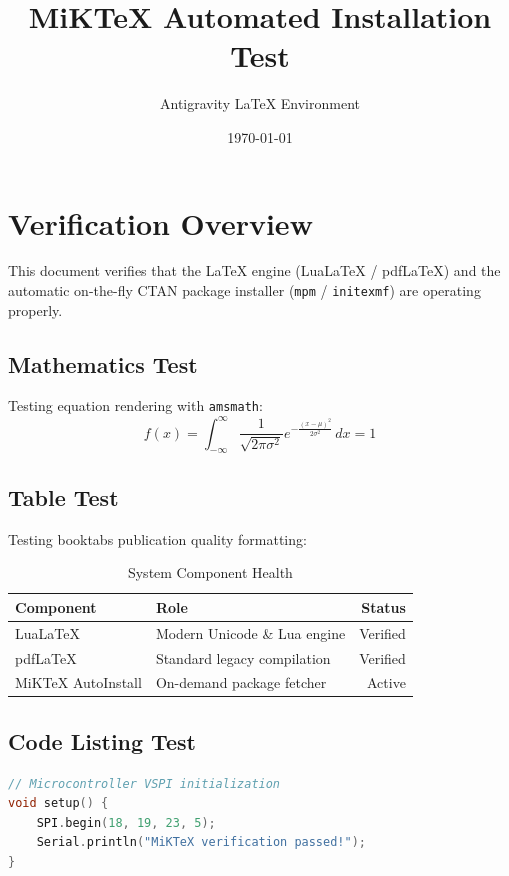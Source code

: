 \documentclass{article}
\title{MiKTeX Automated Installation Test}
\author{Antigravity LaTeX Environment}
\date{\today}
\begin{document}
\maketitle

\section{Verification Overview}
This document verifies that the LaTeX engine (LuaLaTeX / pdfLaTeX) and the automatic on-the-fly CTAN package installer (\texttt{mpm} / \texttt{initexmf}) are operating properly.

\subsection{Mathematics Test}
Testing equation rendering with \texttt{amsmath}:
\begin{equation}
    f(x) = \int_{-\infty}^{\infty} \frac{1}{\sqrt{2\pi\sigma^2}} e^{-\frac{(x-\mu)^2}{2\sigma^2}} \, dx = 1
\end{equation}

\subsection{Table Test}
Testing booktabs publication quality formatting:
\begin{table}[htbp]
\centering
\begin{tabular}{llr}
\toprule
\textbf{Component} & \textbf{Role} & \textbf{Status} \\
\midrule
LuaLaTeX & Modern Unicode \& Lua engine & Verified \\
pdfLaTeX & Standard legacy compilation & Verified \\
MiKTeX AutoInstall & On-demand package fetcher & Active \\
\bottomrule
\end{tabular}
\caption{System Component Health}
\end{table}

\subsection{Code Listing Test}
\begin{lstlisting}[language=C++]
// Microcontroller VSPI initialization
void setup() {
    SPI.begin(18, 19, 23, 5);
    Serial.println("MiKTeX verification passed!");
}
\end{lstlisting}
\end{document}
